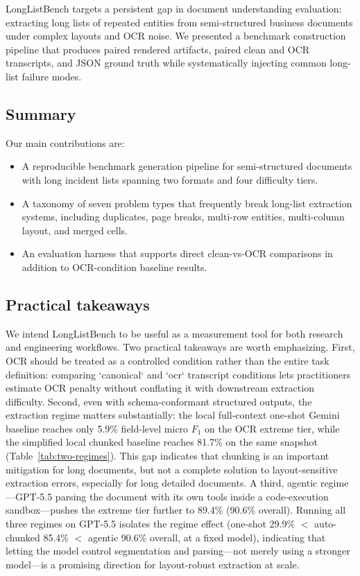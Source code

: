LongListBench targets a persistent gap in document understanding evaluation: extracting long lists of repeated entities from semi-structured business documents under complex layouts and OCR noise. We presented a benchmark construction pipeline that produces paired rendered artifacts, paired clean and OCR transcripts, and JSON ground truth while systematically injecting common long-list failure modes.

\subsection{Summary}
Our main contributions are:
\begin{itemize}
    \item A reproducible benchmark generation pipeline for semi-structured documents with long incident lists spanning two formats and four difficulty tiers.
    \item A taxonomy of seven problem types that frequently break long-list extraction systems, including duplicates, page breaks, multi-row entities, multi-column layout, and merged cells.
    \item An evaluation harness that supports direct clean-vs-OCR comparisons in addition to OCR-condition baseline results.
\end{itemize}

\subsection{Practical takeaways}
We intend LongListBench to be useful as a measurement tool for both research and engineering workflows. Two practical takeaways are worth emphasizing. First, OCR should be treated as a controlled condition rather than the entire task definition: comparing `canonical` and `ocr` transcript conditions lets practitioners estimate OCR penalty without conflating it with downstream extraction difficulty. Second, even with schema-conformant structured outputs, the extraction regime matters substantially: the local full-context one-shot Gemini baseline reaches only 5.9\% field-level micro $F_1$ on the OCR extreme tier, while the simplified local chunked baseline reaches 81.7\% on the same snapshot (Table~\ref{tab:two-regimes}). This gap indicates that chunking is an important mitigation for long documents, but not a complete solution to layout-sensitive extraction errors, especially for long detailed documents. A third, agentic regime---GPT-5.5 parsing the document with its own tools inside a code-execution sandbox---pushes the extreme tier further to 89.4\% (90.6\% overall). Running all three regimes on GPT-5.5 isolates the regime effect (one-shot 29.9\% $<$ auto-chunked 85.4\% $<$ agentic 90.6\% overall, at a fixed model), indicating that letting the model control segmentation and parsing---not merely using a stronger model---is a promising direction for layout-robust extraction at scale.

